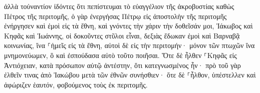 \documentclass{openreader}
\begin{document}
ἀλλὰ τοὐναντίον ἰδόντες ὅτι πεπίστευμαι τὸ εὐαγγέλιον τῆς ἀκροβυστίας καθὼς Πέτρος τῆς περιτομῆς, 
ὁ γὰρ ἐνεργήσας Πέτρῳ εἰς ἀποστολὴν τῆς περιτομῆς ἐνήργησεν καὶ ἐμοὶ εἰς τὰ ἔθνη, 
καὶ γνόντες τὴν χάριν τὴν δοθεῖσάν μοι, Ἰάκωβος καὶ Κηφᾶς καὶ Ἰωάννης, οἱ δοκοῦντες στῦλοι εἶναι, δεξιὰς ἔδωκαν ἐμοὶ καὶ Βαρναβᾷ κοινωνίας, ἵνα ⸀ἡμεῖς εἰς τὰ ἔθνη, αὐτοὶ δὲ εἰς τὴν περιτομήν· 
μόνον τῶν πτωχῶν ἵνα μνημονεύωμεν, ὃ καὶ ἐσπούδασα αὐτὸ τοῦτο ποιῆσαι. 
Ὅτε δὲ ἦλθεν ⸀Κηφᾶς εἰς Ἀντιόχειαν, κατὰ πρόσωπον αὐτῷ ἀντέστην, ὅτι κατεγνωσμένος ἦν· 
πρὸ τοῦ γὰρ ἐλθεῖν τινας ἀπὸ Ἰακώβου μετὰ τῶν ἐθνῶν συνήσθιεν· ὅτε δὲ ⸀ἦλθον, ὑπέστελλεν καὶ ἀφώριζεν ἑαυτόν, φοβούμενος τοὺς ἐκ περιτομῆς. 
\end{document}
